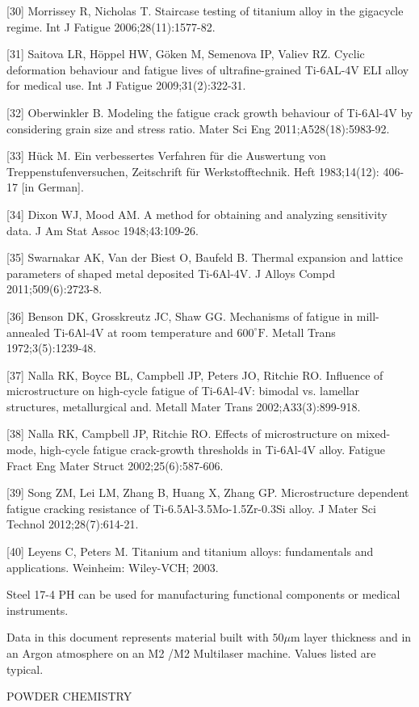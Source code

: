 \documentclass[10pt]{article}
\begin{document}
[30] Morrissey R, Nicholas T. Staircase testing of titanium alloy in the gigacycle regime. Int J Fatigue 2006;28(11):1577-82.

[31] Saitova LR, Höppel HW, Göken M, Semenova IP, Valiev RZ. Cyclic deformation behaviour and fatigue lives of ultrafine-grained Ti-6AL-4V ELI alloy for medical use. Int J Fatigue 2009;31(2):322-31.

[32] Oberwinkler B. Modeling the fatigue crack growth behaviour of Ti-6Al-4V by considering grain size and stress ratio. Mater Sci Eng 2011;A528(18):5983-92.

[33] Hück M. Ein verbessertes Verfahren für die Auswertung von Treppenstufenversuchen, Zeitschrift für Werkstofftechnik. Heft 1983;14(12): 406-17 [in German].

[34] Dixon WJ, Mood AM. A method for obtaining and analyzing sensitivity data. J Am Stat Assoc 1948;43:109-26.

[35] Swarnakar AK, Van der Biest O, Baufeld B. Thermal expansion and lattice parameters of shaped metal deposited Ti-6Al-4V. J Alloys Compd 2011;509(6):2723-8.

[36] Benson DK, Grosskreutz JC, Shaw GG. Mechanisms of fatigue in mill-annealed Ti-6Al-4V at room temperature and $600^{\circ} \mathrm{F}$. Metall Trans 1972;3(5):1239-48.

[37] Nalla RK, Boyce BL, Campbell JP, Peters JO, Ritchie RO. Influence of microstructure on high-cycle fatigue of Ti-6Al-4V: bimodal vs. lamellar structures, metallurgical and. Metall Mater Trans 2002;A33(3):899-918.

[38] Nalla RK, Campbell JP, Ritchie RO. Effects of microstructure on mixed-mode, high-cycle fatigue crack-growth thresholds in Ti-6Al-4V alloy. Fatigue Fract Eng Mater Struct 2002;25(6):587-606.

[39] Song ZM, Lei LM, Zhang B, Huang X, Zhang GP. Microstructure dependent fatigue cracking resistance of Ti-6.5Al-3.5Mo-1.5Zr-0.3Si alloy. J Mater Sci Technol 2012;28(7):614-21.

[40] Leyens C, Peters M. Titanium and titanium alloys: fundamentals and applications. Weinheim: Wiley-VCH; 2003.

Steel 17-4 PH can be used for manufacturing functional components or medical instruments.

Data in this document represents material built with $50 \mu \mathrm{m}$ layer thickness and in an Argon atmosphere on an M2 /M2 Multilaser machine. Values listed are typical.

POWDER CHEMISTRY
\end{document}
